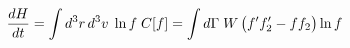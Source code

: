 \documentclass[preview]{standalone}
\begin{document}
\begin{align*}
\special{dvisvgm:raw <g id='unique000'>}\dv{H}{t}=\int d^3r\,d^3v\;\ln f\;C[f]=\int d\Gamma\;W\,\big(f'f_2'-ff_2\big)\ln f\special{dvisvgm:raw </g>}
\end{align*}
\end{document}
